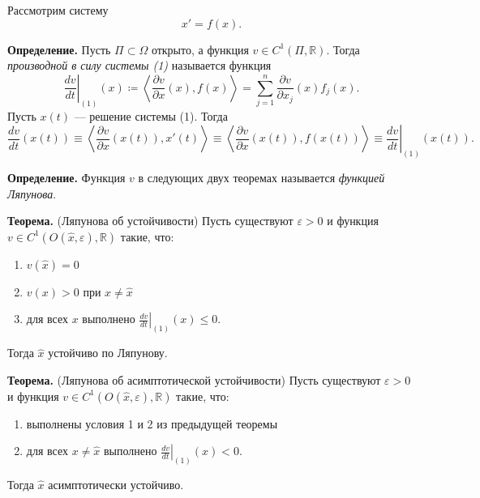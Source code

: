 
Рассмотрим систему
\setcounter{equation}{0}
\begin{equation}
    x' = f(x).
\end{equation}

\textbf{Определение.} Пусть $\Pi \subset \Omega$ открыто, а функция $v \in C^1(\Pi, \mathbb{R})$. Тогда \textit{производной в силу системы (1)} называется функция
\[
  \left.\frac{dv}{dt}\right|_{(1)}(x) \coloneq \left< \frac{\partial v}{\partial x}(x), f(x) \right> = \sum_{j=1}^n{\frac{\partial v}{\partial x_j}(x)f_j(x)}.
\]
Пусть $x(t)$ --- решение системы (1). Тогда
\[
    \frac{dv}{dt}(x(t)) \equiv \left< \frac{\partial v}{\partial x}(x(t)), x'(t) \right> \equiv \left< \frac{\partial v}{\partial x}(x(t)), f(x(t)) \right> \equiv \left.\frac{dv}{dt}\right|_{(1)}(x(t)).
\]

\textbf{Определение.} Функция $v$ в следующих двух теоремах называется \textit{функцией Ляпунова}.

\textbf{Теорема.} (Ляпунова об устойчивости) Пусть существуют $\varepsilon > 0$ и функция $v \in C^1(O(\widehat{x}, \varepsilon), \mathbb R)$ такие, что:
\begin{enumerate}
  \item $v(\widehat{x}) = 0$
  \item $v(x) > 0$ при $x \ne \widehat{x}$
  \item для всех $x$ выполнено $\left.\frac{dv}{dt}\right|_{(1)}(x) \le 0$.
\end{enumerate}
Тогда $\widehat{x}$ устойчиво по Ляпунову.

\textbf{Теорема.} (Ляпунова об асимптотической устойчивости) Пусть существуют $\varepsilon > 0$ и функция $v \in C^1(O(\widehat{x}, \varepsilon), \mathbb R)$ такие, что:
\begin{enumerate}
  \item выполнены условия 1 и 2 из предыдущей теоремы
  \item для всех $x \ne \widehat{x}$ выполнено $\left.\frac{dv}{dt}\right|_{(1)}(x) < 0$.
\end{enumerate}
Тогда $\widehat{x}$ асимптотически устойчиво.

